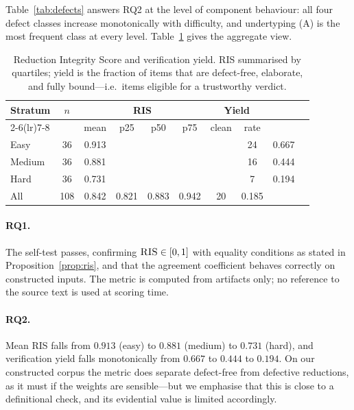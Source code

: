 \documentclass[11pt,a4paper]{article}
\theoremstyle{plain}
\theoremstyle{definition}
\newcommand{\RIS}{\textnormal{\textsc{RIS}}}
\begin{document}
Table~\ref{tab:defects} answers RQ2 at the level of component behaviour: all
four defect classes increase monotonically with difficulty, and undertyping
(A) is the most frequent class at every level. Table~\ref{tab:ris} gives the
aggregate view.

\begin{table}[htbp]
\centering
\caption{Reduction Integrity Score and verification yield. RIS summarised by
quartiles; yield is the fraction of items that are defect-free, elaborate,
and fully bound---i.e.\ items eligible for a trustworthy verdict.}
\label{tab:ris}
\begin{tabular}{lccccccccc}
\toprule
Stratum & $n$ & \multicolumn{4}{c}{\RIS{}} & \multicolumn{2}{c}{Yield} \\
\cmidrule(lr){2-6}\cmidrule(lr){7-8}
 & & mean & p25 & p50 & p75 & clean & rate \\
\midrule
Easy   & 36 & 0.913 & \multicolumn{4}{c}{} & 24 & 0.667 \\
Medium & 36 & 0.881 & \multicolumn{4}{c}{} & 16 & 0.444 \\
Hard   & 36 & 0.731 & \multicolumn{4}{c}{} & 7& 0.194 \\
\midrule
All    & 108 & 0.842 & 0.821 & 0.883 & 0.942 & 20 & 0.185 \\
\bottomrule
\end{tabular}
\end{table}

\paragraph{RQ1.} The self-test passes, confirming $\RIS\in[0,1]$ with
equality conditions as stated in Proposition~\ref{prop:ris}, and that the
agreement coefficient behaves correctly on constructed inputs. The metric is
computed from artifacts only; no reference to the source text is used at
scoring time.

\paragraph{RQ2.} Mean \RIS{} falls from $0.913$ (easy) to $0.881$ (medium)
to $0.731$ (hard), and verification yield falls monotonically from $0.667$
to $0.444$ to $0.194$. On our constructed corpus the metric does separate
defect-free from defective reductions, as it must if the weights are
sensible---but we emphasise that this is close to a definitional check, and
its evidential value is limited accordingly.
\end{document}
